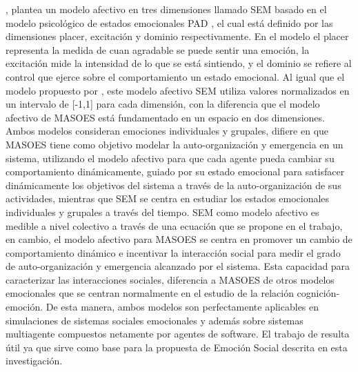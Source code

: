 \cite{rincon2015}, plantea un modelo afectivo en tres dimensiones llamado SEM
 basado en el modelo
psicológico de estados emocionales PAD ,
el cual está definido por las dimensiones placer,
excitación y dominio respectivamente. En el modelo el placer representa la
medida de cuan agradable se puede sentir una emoción, la excitación mide la
intensidad de lo que se está sintiendo, y el dominio se refiere al control que
ejerce sobre el comportamiento un estado emocional. Al igual que el modelo
propuesto por \cite{perozo2012}, este modelo afectivo SEM utiliza valores
normalizados en un intervalo de [-1,1] para cada dimensión, con la diferencia
que el modelo afectivo de MASOES está fundamentado en un espacio en dos
dimensiones. Ambos modelos consideran emociones individuales y grupales, difiere
en que MASOES tiene como objetivo modelar la auto-organización y emergencia en
un sistema, utilizando el modelo afectivo para que cada agente pueda cambiar su
comportamiento dinámicamente, guiado por su estado emocional para satisfacer
dinámicamente los objetivos del sistema a través de la auto-organización de sus
actividades, mientras que SEM se centra en estudiar los estados emocionales
individuales y grupales a través del tiempo. SEM como modelo afectivo es medible
a nivel colectivo a través de una ecuación que se propone en el trabajo, en
cambio, el modelo afectivo para MASOES se centra en promover un cambio de
comportamiento dinámico e incentivar la interacción social para medir el grado
de auto-organización y emergencia alcanzado por el sistema. Esta capacidad para
caracterizar las interacciones sociales, diferencia a MASOES de otros modelos
emocionales que se centran normalmente en el estudio de la relación
cognición-emoción. De esta manera, ambos modelos son perfectamente aplicables en
simulaciones de sistemas sociales emocionales y además sobre sistemas
multiagente compuestos netamente por agentes de software.
El trabajo de \citeauthor{rincon2015}
resulta útil ya que sirve como base para la propuesta de Emoción Social descrita en esta investigación.

